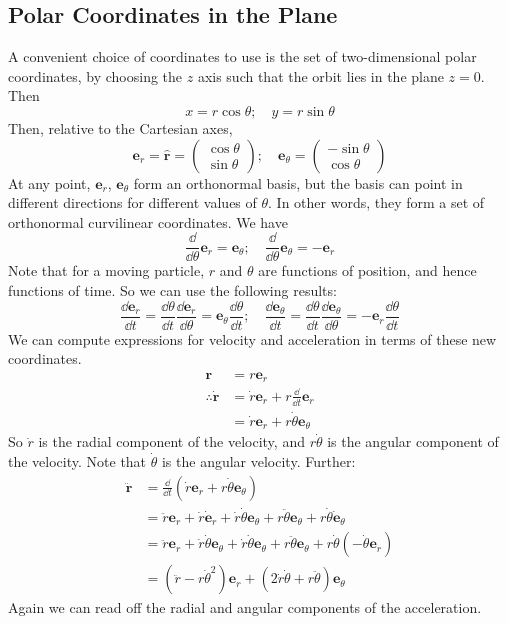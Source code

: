 \documentclass{article}
\begin{document}
\subsection{Polar Coordinates in the Plane}
A convenient choice of coordinates to use is the set of two-dimensional polar coordinates, by choosing the $z$ axis such that the orbit lies in the plane $z=0$. Then
\[ x = r\cos\theta;\quad y = r\sin\theta \]
Then, relative to the Cartesian axes,
\[ \bm e_r = \hat{\bm r} = \begin{pmatrix}
        \cos\theta \\ \sin\theta
    \end{pmatrix};\quad \bm e_\theta = \begin{pmatrix}
        -\sin\theta \\ \cos\theta
    \end{pmatrix} \]
At any point, $\bm e_r$, $\bm e_\theta$ form an orthonormal basis, but the basis can point in different directions for different values of $\theta$. In other words, they form a set of orthonormal curvilinear coordinates. We have
\[ \frac{\dd}{\dd \theta}\bm e_r = \bm e_\theta;\quad \frac{\dd}{\dd \theta}\bm e_\theta = -\bm e_r \]
Note that for a moving particle, $r$ and $\theta$ are functions of position, and hence functions of time. So we can use the following results:
\[ \frac{\dd \bm e_r}{\dd t} = \frac{\dd \theta}{\dd t} \frac{\dd \bm e_r}{\dd \theta} = \bm e_\theta \frac{\dd \theta}{\dd t};\quad \frac{\dd \bm e_\theta}{\dd t} = \frac{\dd \theta}{\dd t} \frac{\dd \bm e_\theta}{\dd \theta} = -\bm e_r \frac{\dd \theta}{\dd t} \]
We can compute expressions for velocity and acceleration in terms of these new coordinates.
\begin{align*}
    \bm r                  & = r \bm e_r                                   \\
    \therefore \dot{\bm r} & = \dot r \bm e_r + r \frac{\dd}{\dd t}\bm e_r \\
                           & = \dot r \bm e_r + r \dot\theta \bm e_\theta
\end{align*}
So $\dot r$ is the radial component of the velocity, and $r\dot\theta$ is the angular component of the velocity. Note that $\dot\theta$ is the angular velocity. Further:
\begin{align*}
    \ddot{\bm r} & = \frac{\dd}{\dd t}\left( \dot r \bm e_r + r \dot \theta \bm e_\theta \right)                                                                                         \\
                 & = \ddot r \bm e_r + \dot r \dot{\bm e}_r + \dot r \dot \theta \bm e_\theta + r \ddot \theta \bm e_\theta + r \dot \theta \dot{\bm e}_\theta                           \\
                 & = \ddot r \bm e_r + \dot r \dot \theta \bm e_\theta + \dot r \dot \theta \bm e_\theta + r \ddot \theta \bm e_\theta + r \dot \theta \left(-\dot \theta \bm e_r\right) \\
                 & = \left(\ddot r - r \dot \theta^2\right) \bm e_r + \left(2\dot r\dot \theta + r\ddot \theta\right) \bm e_\theta
\end{align*}
Again we can read off the radial and angular components of the acceleration.
\end{document}
